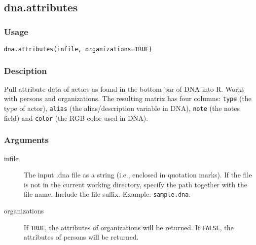 \documentclass[a4paper, 10pt]{article}
\begin{document}
\subsection{dna.attributes}
\subsubsection*{Usage}
\begin{verbatim}
dna.attributes(infile, organizations=TRUE)
\end{verbatim}
\subsubsection*{Desciption}
Pull attribute data of actors as found in the bottom bar of DNA into R. Works with persons and organizations. The resulting matrix has four columns: \texttt{type} (the type of actor), \texttt{alias} (the alias/description variable in DNA), \texttt{note} (the notes field) and \texttt{color} (the RGB color used in DNA).
\subsubsection*{Arguments}
\begin{description}
 \item[infile]{ The input .dna file as a string (i.e., enclosed in quotation marks). If the file is not in the current working directory, specify the path together with the file name. Include the file suffix. Example: \texttt{sample.dna}. }
 \item[organizations]{If \texttt{TRUE}, the attributes of organizations will be returned. If \texttt{FALSE}, the attributes of persons will be returned.}
\end{description}
\end{document}
